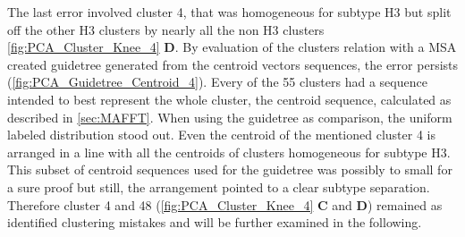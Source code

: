 \vspace{1em}

The last error involved cluster 4, that was homogeneous for subtype H3 but split off the other H3 clusters by nearly all the non H3 clusters \autoref{fig:PCA_Cluster_Knee_4} \textbf{\textsf{D}}. By evaluation of the clusters relation with a \gls{MSA} created guidetree generated from the centroid vectors sequences, the error persists (\autoref{fig:PCA_Guidetree_Centroid_4}). Every of the 55 clusters had a sequence intended to best represent the whole cluster, the centroid sequence, calculated as described in \autoref{sec:MAFFT}. When using the guidetree as comparison, the uniform labeled distribution stood out. Even the centroid of the mentioned cluster 4 is arranged in a line with all the centroids of clusters homogeneous for subtype H3. This subset of centroid sequences used for the guidetree was possibly to small for a sure proof but still, the arrangement pointed to a clear subtype separation. Therefore cluster 4 and 48 (\autoref{fig:PCA_Cluster_Knee_4} \textbf{\textsf{C}} and \textbf{\textsf{D}}) remained as identified clustering mistakes and will be further examined in the following.

